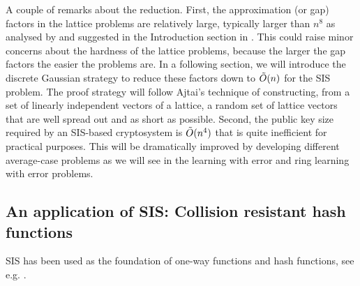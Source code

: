\documentclass[../main.tex]{subfiles}
\begin{document}
A couple of remarks about the reduction. First, the approximation (or gap) factors in the lattice problems are relatively large, typically larger than $n^8$ as analysed by \citet{cai1997improved} and suggested in the Introduction section in \citep{micciancio07worst}. This could raise minor concerns about the hardness of the lattice problems, because the larger the gap factors the easier the problems are. In a following section, we will introduce the discrete Gaussian strategy to reduce these factors down to $\Tilde{O}(n)$ for the SIS problem.
The proof strategy will follow Ajtai's technique of constructing, from a set of linearly independent vectors of a lattice, a random set of lattice vectors that are well spread out and as short as possible.
Second, the public key size required by an SIS-based cryptosystem is $\Tilde{O}(n^4)$ that is quite inefficient for practical purposes. This will be dramatically improved by developing different average-case problems as we will see in the learning with error and ring learning with error problems. 



\subsection{An application of SIS: Collision resistant hash functions}

SIS has been used as the foundation of one-way functions and hash functions, see e.g. \citep{lyubashevsky2010ideal}.

%

\end{document}
